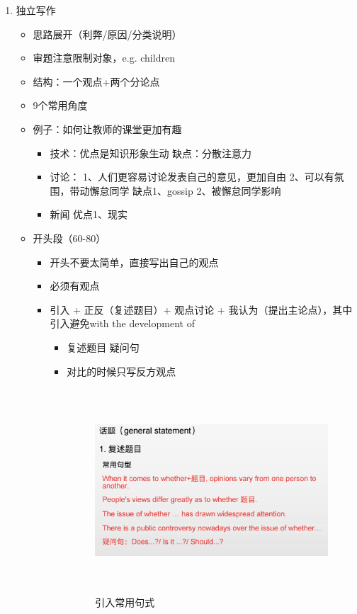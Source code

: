 \documentclass[UTF8]{ctexart}
\begin{document}
\begin{enumerate}[A]
  \item 独立写作
  \begin{itemize}
    \item 思路展开（利弊/原因/分类说明）
    \item 审题注意限制对象，e.g. children
    \item 结构：一个观点+两个分论点
    \item 9个常用角度
    \item 例子：如何让教师的课堂更加有趣
    \begin{itemize}
      \item 技术：优点是知识形象生动 缺点：分散注意力
      \item 讨论： 1、人们更容易讨论发表自己的意见，更加自由 2、可以有氛围，带动懈怠同学 缺点1、gossip 2、被懈怠同学影响
      \item 新闻 优点1、现实
    \end{itemize}
    \item 开头段（60-80）
    \begin{itemize}
      \item 开头不要太简单，直接写出自己的观点
      \item 必须有观点
      \item 引入 + 正反（复述题目）+ 观点讨论 + 我认为（提出主论点），其中引入避免with the development of
      \begin{itemize}
        \item 复述题目 疑问句
        \item 对比的时候只写反方观点
      \begin{figure}[!htp]
        \centering
        \includegraphics[width=4.00in,height=3.00in]{xiezuo1.png}
        \caption{引入常用句式}
      \end{figure}

\end{itemize}
\end{itemize}
\end{itemize}
\end{enumerate}
\end{document}
